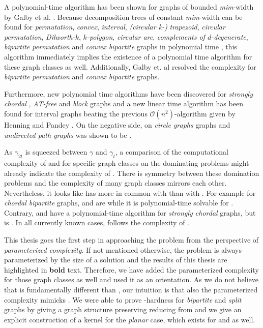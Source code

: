 A polynomial-time algorithm has been shown for graphs of bounded \textit{mim}-width by Galby et al. \cite{Galby2020}.
Because decomposition trees of constant \textit{mim}-width can be found for \textit{permutation}, \textit{convex}, \textit{interval}, \textit{(circular k-)} \textit{trapezoid}, \textit{circular permutation}, \textit{Dilworth-$k$}, \textit{$k$-polygon}, \textit{circular arc}, \textit{complements of $d$-degenerate}, \textit{bipartite permutation} and \textit{convex bipartite} graphs in polynomial time \cite{Belmonte2011}, this algorithm immediately implies the existence of a polynomial time algorithm for these graph classes as well. 
Additionally, Galby et. al resolved the complexity for \textit{bipartite permutation} and \textit{convex bipartite} graphs.

Furthermore, new polynomial time algorithms have been discovered for \textit{strongly chordal} \cite{Tripathi2021}, \textit{AT-free} \cite{Kloks2021} and \textit{block} \cite{Henning2022} graphs and a new linear time algorithm has been found for interval graphs \cite{Pradhan2021} beating the previous $\mathcal{O}(n^2)$-algorithm given by Henning and Pandey \cite{Henning2019}.
On the negative side, \sdom on \textit{circle graphs} \cite{Kloks2021} graphs and \textit{undirected path graphs} \cite{Henning2019} was shown to be \NPc.

As $\gamma_{2t}$ is squeezed between $\gamma$ and $\gamma_t$, a comparison of the computational complexity of \sdom and \tdom for specific graph classes on the dominating problems might already indicate the complexity of \sdoms.
There is symmetry between these domination problems and the complexity of many graph classes mirrors each other.
Nevertheless, it looks like \sdoms has more in common with \doms than with \tdoms.
For example for \textit{chordal bipartite} graphs, \sdoms and \doms are \NPc while it is polynomial-time solvable for \tdoms. 
Contrary, \sdoms and \doms have a polynomial-time algorithm for \textit{strongly chordal} graphs, but \tdoms is \NPc.
In all currently known cases, \sdom follows the complexity of \dom.

This thesis goes the first step in approaching the problem from the perspective of \textit{parameterized complexity}.
If not mentioned otherwise, the problem is always parameterized by the size of a solution and the results of this thesis are highlighted in \textbf{bold} text.
Therefore, we have added the parameterized complexity for those graph classes as well and used it as an orientation.
As we do not believe that \sdoms is fundamentally different than \doms, our intuition is that also the parameterized complexity mimicks \sdoms. 
We were able to prove \WTWO-hardness for \textit{bipartite} and \textit{split} graphs by giving a graph structure preserving reducing from \doms and we give an explicit construction of a kernel for the \textit{planar} case, which exists for \doms \cite{Alber2004} and \tdoms \cite{Garnero2019} as well.

